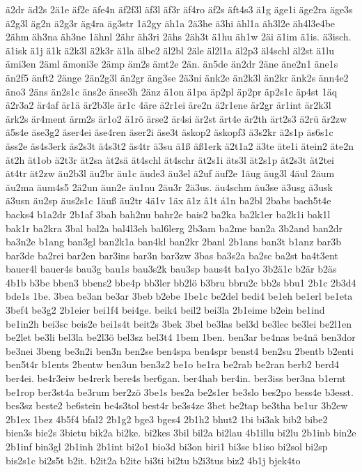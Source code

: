 {ä2dr
äd2s
2ä1e
äf2e
äfe4n
äf2f3l
äf3l
äf3r
äf4ro
äf2s
äft4s3
ä1g
äge1i
äge2ra
äge3s
ä2g3l
äg2n
ä2g3r
äg4ra
äg3str
1ä2gy
äh1a
2ä3he
ä3hi
ähl1a
äh3l2e
äh4l3e4be
2ähm
äh3na
äh3ne
1ähnl
2ähr
äh3ri
2ähs
2äh3t
ä1hu
äh1w
2äi
ä1im
ä1is.
ä3isch.
ä1isk
ä1j
ä1k
ä2k3l
ä2k3r
ä1la
älbe2
äl2bl
2äle
äl2l1a
äl2p3
äl4schl
äl2st
ä1lu
ämi3en
2äml
ämoni3e
2ämp
äm2s
ämt2e
2än.
än5de
än2dr
2äne
äne2n1
äne1s
än2f5
änft2
2änge
2än2g3l
än2gr
äng3se
2ä3ni
änk2e
än2k3l
än2kr
änk2s
änn4e2
äno3
2äns
än2s1c
äns2e
änse3h
2änz
ä1on
ä1pa
äp2pl
äp2pr
äp2s1c
äp4st
1äq
ä2r3a2
är4af
är1ä
är2b3le
är1c
4äre
ä2r1ei
äre2n
ä2r1ene
är2gr
är1int
är2k3l
ärk2s
är4ment
ärm2s
är1o2
ä1rö
ärse2
är4si
är2st
ärt4e
är2th
ärt2s3
ä2rü
är2zw
ä5s4e
äse3g2
äser4ei
äse4ren
äser2i
äse3t
äskop2
äskopf3
ä3s2kr
ä2s1p
äs6s1c
äss2e
äs4s3erk
äs2s3t
ä4s3t2
äs4tr
ä3su
ä1ß
äß1erk
ä2t1a2
ä3te
äte1i
ätein2
äte2n
ät2h
ät1ob
ä2t3r
ät2sa
ät2sä
ät4schl
ät4schr
ät2s1i
äts3l
ät2s1p
ät2s3t
ät2tei
ät4tr
ät2zw
äu2b3l
äu2br
äu1c
äude3
äu3el
ä2uf
äuf2e
1äug
äug3l
4äul
2äum
äu2ma
äum4s5
2ä2un
äun2e
äu1nu
2äu3r
2ä3us.
äu4schm
äu3se
ä3usg
ä3usk
ä3usn
äu2sp
äus2s1c
1äuß
äu2tr
4ä1v
1äx
ä1z
â1t
á1n
ba2bl
2babs
bach5t4e
backs4
b1a2dr
2b1af
3bah
bah2nu
bahr2e
bais2
ba2ka
ba2k1er
ba2k1i
bak1l
bak1r
ba2kra
3bal
bal2a
bal4l3eh
bal6lerg
2b3am
ba2me
ban2a
3b2and
ban2dr
ba3n2e
b1ang
ban3gl
ban2k1a
ban4kl
ban2kr
2banl
2b1ans
ban3t
b1anz
bar3b
bar3de
ba2rei
bar2en
bar3ins
bar3n
bar3zw
3bas
ba3s2a
ba2sc
ba2st
ba4t3ent
bauer4l
bauer4s
bau3g
bau1s
bau3s2k
bau3sp
baus4t
ba1yo
3b2ä1c
b2är
b2äs
4b1b
b3be
bben3
bbens2
bbe4p
bb3ler
bb2lö
b3bru
bbru2c
bb2s
bbu1
2b1c
2b3d4
bde1s
1be.
3bea
be3an
be3ar
3beb
b2ebe
1be1c
be2del
bedi4
be1eh
be1erl
be1eta
3bef4
be3g2
2b1eier
bei1f4
bei4ge.
beik4
beil2
bei3la
2b1eime
b2ein
be1ind
be1in2h
bei3sc
beis2e
bei1s4t
beit2s
3bek
3bel
be3las
bel3d
be3lec
be3lei
be2l1en
be2let
be3li
bel3la
be2l3ö
bel3sz
bel3t4
1bem
1ben.
ben3ar
be4nas
be4nä
ben3dor
be3nei
3beng
be3n2i
ben3n
ben2se
ben4spa
ben4spr
benst4
ben2su
2bentb
b2enti
ben5t4r
b1ents
2bentw
ben3un
ben3z2
be1o
be1ra
be2rab
be2ran
berb2
berd4
ber4ei.
be4r3eiw
be4rerk
bere4s
ber6gan.
ber4hab
ber4in.
ber3iss
ber3na
b1ernt
be1rop
ber3st4a
be3rum
ber2zö
3be1s
bes2a
be2s1er
be3slo
bes2po
bess4e
b3esst.
bes3sz
beste2
be6stein
be4s3tol
best4r
be3s4ze
3bet
be2tap
be3tha
be1ur
3b2ew
2b1ex
1bez
4b5f4
bfal2
2b1g2
bge3
bges4
2b1h2
bhut2
1bi
bi3ak
bib2
bibe2
bien3s
bie2s
3bietu
bik2a
bi2ke.
bi2kes
3bil
bil2a
bi2lau
4b1illu
bi2lu
2b1inb
bin2e
2b1inf
bin3gl
2b1inh
2b1int
bi2o1
bio3d
bi3on
biri1
bi3se
b1iso
bi2sol
bi2sp
bis2s1c
bi2s5t
b2it.
b2it2a
b2ite
bi3ti
bi2tu
b2i3tus
biz2
4b1j
bjek4to
}
